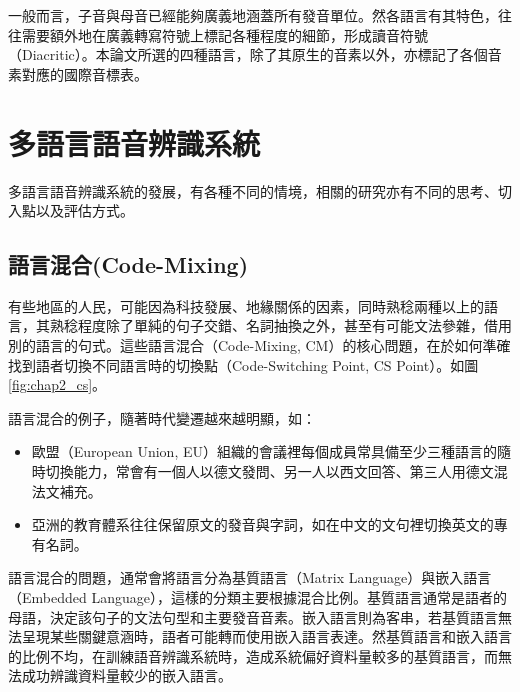 一般而言，子音與母音已經能夠廣義地涵蓋所有發音單位。然各語言有其特色，往往需要額外地在廣義轉寫符號上標記各種程度的細節，形成讀音符號（Diacritic）。本論文所選的四種語言，除了其原生的音素以外，亦標記了各個音素對應的國際音標表。

\section{多語言語音辨識系統}
多語言語音辨識系統的發展，有各種不同的情境，相關的研究亦有不同的思考、切入點以及評估方式。
\subsection{語言混合(Code-Mixing)}
有些地區的人民，可能因為科技發展、地緣關係的因素，同時熟稔兩種以上的語言，其熟稔程度除了單純的句子交錯、名詞抽換之外，甚至有可能文法參雜，借用別的語言的句式。這些語言混合（Code-Mixing, CM）的核心問題，在於如何準確找到語者切換不同語言時的切換點（Code-Switching Point, CS Point）。如圖\ref{fig:chap2_cs}。

語言混合的例子，隨著時代變遷越來越明顯，如：
\begin{itemize}
\itemsep -2pt
\item 歐盟（European Union, EU）組織的會議裡每個成員常具備至少三種語言的隨時切換能力，常會有一個人以德文發問、另一人以西文回答、第三人用德文混法文補充。
\item 亞洲的教育體系往往保留原文的發音與字詞，如在中文的文句裡切換英文的專有名詞。
\end{itemize}
語言混合的問題，通常會將語言分為基質語言（Matrix Language）與嵌入語言（Embedded Language），這樣的分類主要根據混合比例。基質語言通常是語者的母語，決定該句子的文法句型和主要發音音素。嵌入語言則為客串，若基質語言無法呈現某些關鍵意涵時，語者可能轉而使用嵌入語言表達。然基質語言和嵌入語言的比例不均，在訓練語音辨識系統時，造成系統偏好資料量較多的基質語言，而無法成功辨識資料量較少的嵌入語言。

